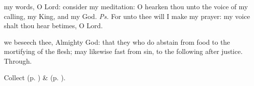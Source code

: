\introit
{} my words, O Lord: consider my meditation: O hearken thou unto the voice of my calling, my King, and my God. \textit{Ps.} For unto thee will I make my prayer: my voice shalt thou hear betimes, O Lord.

\collect
{} we beseech thee, Almighty God: that they who do abstain from food to the mortifying of the flesh; may likewise fast from sin, to the following after justice. Through.
\begin{rubric}
     Collect  (p. \pageref{AshWednesdayMassCollect}) \&   (p. \pageref{SPLivingDeparted}).
\end{rubric}

